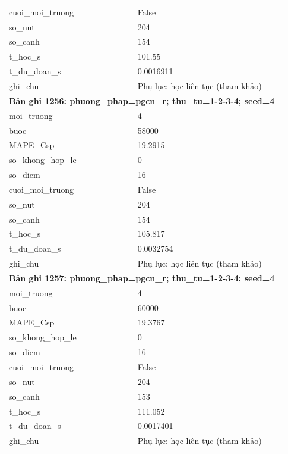 \begin{longtable}{p{0.43\linewidth}p{0.50\linewidth}}
cuoi\_\allowbreak moi\_\allowbreak truong & False \\
so\_\allowbreak nut & 204 \\
so\_\allowbreak canh & 154 \\
t\_\allowbreak hoc\_\allowbreak s & 101.55 \\
t\_\allowbreak du\_\allowbreak doan\_\allowbreak s & 0.0016911 \\
ghi\_\allowbreak chu & Phụ lục: học liên tục (tham khảo) \\
\midrule
\multicolumn{2}{p{0.95\linewidth}}{\textbf{Bản ghi 1256: phuong\_phap=pgcn\_r; thu\_tu=1-2-3-4; seed=4}} \\
moi\_\allowbreak truong & 4 \\
buoc & 58000 \\
MAPE\_\allowbreak Csp & 19.2915 \\
so\_\allowbreak khong\_\allowbreak hop\_\allowbreak le & 0 \\
so\_\allowbreak diem & 16 \\
cuoi\_\allowbreak moi\_\allowbreak truong & False \\
so\_\allowbreak nut & 204 \\
so\_\allowbreak canh & 154 \\
t\_\allowbreak hoc\_\allowbreak s & 105.817 \\
t\_\allowbreak du\_\allowbreak doan\_\allowbreak s & 0.0032754 \\
ghi\_\allowbreak chu & Phụ lục: học liên tục (tham khảo) \\
\midrule
\multicolumn{2}{p{0.95\linewidth}}{\textbf{Bản ghi 1257: phuong\_phap=pgcn\_r; thu\_tu=1-2-3-4; seed=4}} \\
moi\_\allowbreak truong & 4 \\
buoc & 60000 \\
MAPE\_\allowbreak Csp & 19.3767 \\
so\_\allowbreak khong\_\allowbreak hop\_\allowbreak le & 0 \\
so\_\allowbreak diem & 16 \\
cuoi\_\allowbreak moi\_\allowbreak truong & False \\
so\_\allowbreak nut & 204 \\
so\_\allowbreak canh & 153 \\
t\_\allowbreak hoc\_\allowbreak s & 111.052 \\
t\_\allowbreak du\_\allowbreak doan\_\allowbreak s & 0.0017401 \\
ghi\_\allowbreak chu & Phụ lục: học liên tục (tham khảo) \\

\end{longtable}
